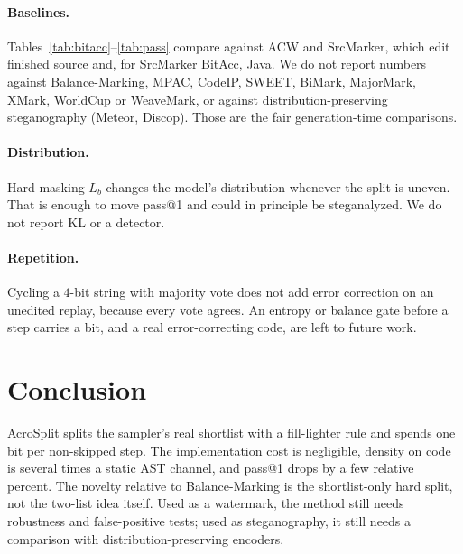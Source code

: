 \documentclass[11pt]{article}
\begin{document}
\paragraph{Baselines.}
Tables~\ref{tab:bitacc}--\ref{tab:pass} compare against ACW and SrcMarker, which edit finished source and, for SrcMarker BitAcc, Java.
We do not report numbers against Balance-Marking, MPAC, CodeIP, SWEET, BiMark, MajorMark, XMark, WorldCup or WeaveMark, or against distribution-preserving steganography (Meteor, Discop).
Those are the fair generation-time comparisons.

\paragraph{Distribution.}
Hard-masking $L_b$ changes the model's distribution whenever the split is uneven.
That is enough to move pass@1 and could in principle be steganalyzed.
We do not report KL or a detector.

\paragraph{Repetition.}
Cycling a $4$-bit string with majority vote does not add error correction on an unedited replay, because every vote agrees.
An entropy or balance gate before a step carries a bit, and a real error-correcting code, are left to future work.

\section{Conclusion}
\label{sec:conclusion}

AcroSplit splits the sampler's real shortlist with a fill-lighter rule and spends one bit per non-skipped step.
The implementation cost is negligible, density on code is several times a static AST channel, and pass@1 drops by a few relative percent.
The novelty relative to Balance-Marking is the shortlist-only hard split, not the two-list idea itself.
Used as a watermark, the method still needs robustness and false-positive tests; used as steganography, it still needs a comparison with distribution-preserving encoders.


\end{document}
